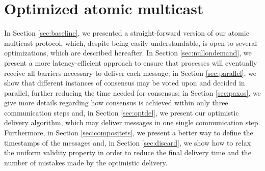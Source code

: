 \documentclass[times, 10pt]{article}
\begin{document}






\section{Optimized atomic multicast}
\label{sec:optimized}

In Section \ref{sec:baseline}, we presented a straight-forward version of our atomic multicast protocol, which, despite being easily understandable, is open to several optimizations, which are described hereafter.  In Section \ref{sec:nullondemand}, we present a more latency-efficient approach to ensure that processes will eventually receive all barriers necessary to deliver each message; in Section \ref{sec:parallel}, we show that different instances of consensus may be voted upon and decided in parallel, further reducing the time needed for consensus; in Section \ref{sec:paxos}, we give more details regarding how consensus is achieved within only three communication steps and, in Section \ref{sec:optdel}, we present our optimistic delivery algorithm, which may deliver messages in one single communication step. Furthermore, in Section \ref{sec:compositets}, we present a better way to define the timestamps of the messages and, in Section \ref{sec:discard}, we show how to relax the uniform validity property in order to reduce the final delivery time and the number of mistakes made by the optimistic delivery.
\end{document}
